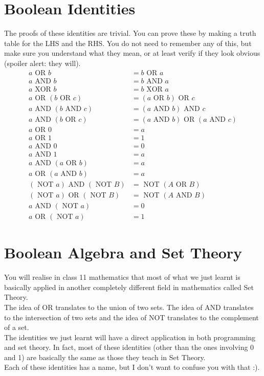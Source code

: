 \documentclass[letterpaper, 12pt]{book}
\begin{document}
\section{Boolean Identities}
The proofs of these identities are trivial. You can prove these by making a truth table for the LHS and the RHS. You do not need to remember any of this, but make sure you understand what they mean, or at least verify if they look obvious (spoiler alert: they will).\\
\begin{align}
a \text{ OR } b &= b \text{ OR } a\\
a \text{ AND } b &= b \text{ AND } a\\
a \text{ XOR } b &= b \text{ XOR } a\\
a \text{ OR } (b \text{ OR } c) &= (a \text{ OR } b) \text{ OR } c\\
a \text{ AND } (b \text{ AND } c) &= (a \text{ AND } b) \text{ AND } c\\
a \text{ AND } (b \text{ OR } c) &= (a \text{ AND } b) \text{ OR } (a \text{ AND } c)\\
a \text{ OR } 0 &= a\\
a \text{ OR } 1 &= 1\\
a \text{ AND } 0 &= 0\\
a \text{ AND } 1 &= a\\
a \text{ AND } (a \text{ OR } b) &= a\\
a \text{ OR } (a \text{ AND } b) &= a\\
(\text{ NOT } a) \text{ AND } (\text{ NOT } B) &= \text{ NOT }(A \text{ OR } B)\\
(\text{ NOT } a) \text{ OR } (\text{ NOT } B) &= \text{ NOT }(A \text{ AND } B)\\
a \text{ AND } (\text{ NOT } a) &= 0\\
a \text{ OR } (\text{ NOT } a) &= 1
\end{align}
\section{Boolean Algebra and Set Theory}
You will realise in class 11 mathematics that most of what we just learnt is basically applied in another completely different field in mathematics called Set Theory.\\
The idea of OR translates to the union of two sets. The idea of AND translates to the intersection of two sets and the idea of NOT translates to the complement of a set.\\
The identities we just learnt will have a direct application in both programming and set theory. In fact, most of these identities (other than the ones involving 0 and 1) are basically the same as those they teach in Set Theory.\\
Each of these identities has a name, but I don't want to confuse you with that :).
\end{document}
